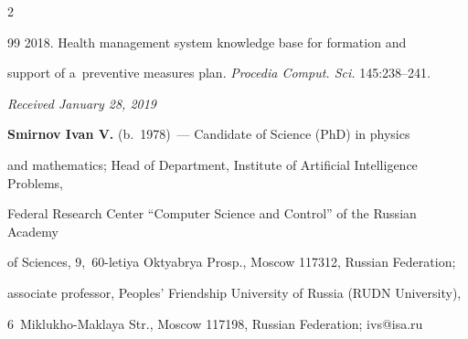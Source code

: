 \begin{multicols}{2}
{{\begin{thebibliography}{99}
   2018. Health management system knowledge base for formation and 


support of a~preventive measures plan. \textit{Procedia Comput. Sci.} 145:238--241.


\end{thebibliography}





 }


 }





\end{multicols}










\hfill{\small\textit{Received January 28, 2019}}












  


  \Contr


  


  \noindent


  \textbf{Smirnov Ivan V.} (b.\ 1978)~--- Candidate of Science (PhD) in physics 


and mathematics; Head of Department, Institute of Artificial Intelligence Problems, 


Federal Research Center ``Computer Science and Control'' of the Russian Academy 


of Sciences, 9,~60-letiya Oktyabrya Prosp., Moscow 117312, Russian Federation; 


associate professor, Peoples' Friendship University of Russia (RUDN University), 


6~Miklukho-Maklaya Str., Moscow 117198, Russian Federation; \mbox{ivs@isa.ru}


  


